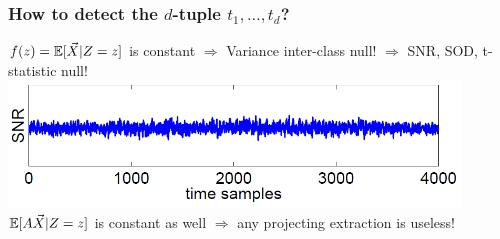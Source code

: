\begin{frame}
\frametitle{How to detect the $d$-tuple $t_1,\dots, t_d$?}
$f(z) = \mathbb{E}[\vec{X}\lvert Z=z]$ is constant $\Rightarrow$  Variance inter-class null! $\Rightarrow$ SNR, SOD, t-statistic null!
\includegraphics[width = 0.9\textwidth]{figures/SNR_2order_new.png} \\
\pause
$\mathbb{E}[A\vec{X}\lvert Z=z]$ is constant as well $\Rightarrow$ any projecting extraction is useless!
\end{frame}
